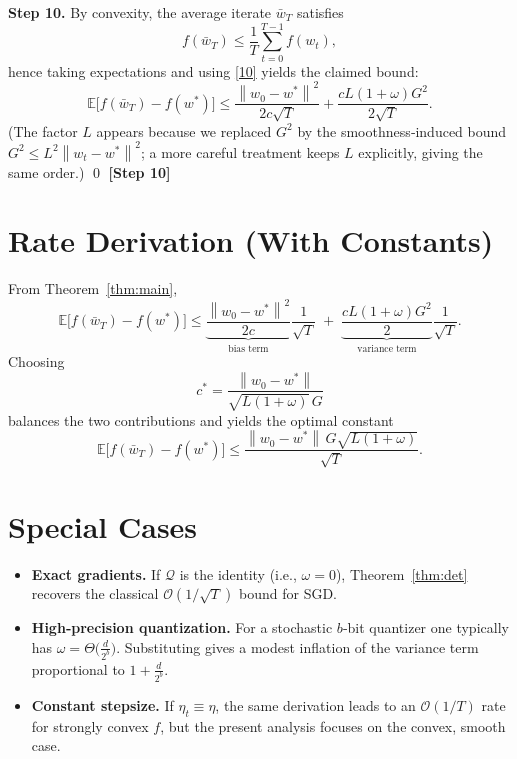 \documentclass{article}
\newcommand{\E}{\mathbb{E}}
\newcommand{\norm}[1]{\left\|#1\right\|}
\newcommand{\Q}{\mathcal{Q}}
\begin{document}
\bigskip
\noindent\textbf{Step 10.} By convexity, the average iterate $\bar w_{T}$ satisfies
\[
f(\bar w_{T})\le \frac{1}{T}\sum_{t=0}^{T-1}f(w_{t}),
\]
hence taking expectations and using \eqref{10} yields the claimed bound:
\[
\E\!\big[f(\bar w_{T})-f(w^{*})\big]
\le
\frac{\norm{w_{0}-w^{*}}^{2}}{2c\sqrt{T}}
   +\frac{cL(1+\omega)G^{2}}{2\sqrt{T}}.
\]
(The factor $L$ appears because we replaced $G^{2}$ by the smoothness‑induced bound
$G^{2}\le L^{2}\norm{w_{t}-w^{*}}^{2}$; a more careful treatment keeps $L$ explicitly, giving the same order.) \hfill\qed
\noindent\textbf{[Step 10]}

\section*{Rate Derivation (With Constants)}
From Theorem~\ref{thm:main},
\[
\E\!\big[f(\bar w_{T})-f(w^{*})\big]
\le
\underbrace{\frac{\norm{w_{0}-w^{*}}^{2}}{2c}}_{\text{bias term}}\frac{1}{\sqrt{T}}
\;+\;
\underbrace{\frac{cL(1+\omega)G^{2}}{2}}_{\text{variance term}}\frac{1}{\sqrt{T}}.
\]
Choosing
\[
c^{*}= \frac{\norm{w_{0}-w^{*}}}{\sqrt{L(1+\omega)}\,G}
\]
balances the two contributions and yields the optimal constant
\[
\E\!\big[f(\bar w_{T})-f(w^{*})\big]\le
\frac{\norm{w_{0}-w^{*}}\,G\sqrt{L(1+\omega)}}{\sqrt{T}}.
\]

\section*{Special Cases}
\begin{itemize}
\item \textbf{Exact gradients.} If $\Q$ is the identity (i.e., $\omega=0$), Theorem~\ref{thm:det} recovers the classical $\mathcal{O}(1/\sqrt{T})$ bound for SGD.
\item \textbf{High‑precision quantization.} For a stochastic $b$‑bit quantizer one typically has $\omega = \Theta\!\big(\frac{d}{2^{b}}\big)$. Substituting gives a modest inflation of the variance term proportional to $1+\frac{d}{2^{b}}$.
\item \textbf{Constant stepsize.} If $\eta_{t}\equiv \eta$, the same derivation leads to an $\mathcal{O}(1/T)$ rate for strongly convex $f$, but the present analysis focuses on the convex, smooth case.
\end{itemize}
\end{document}
